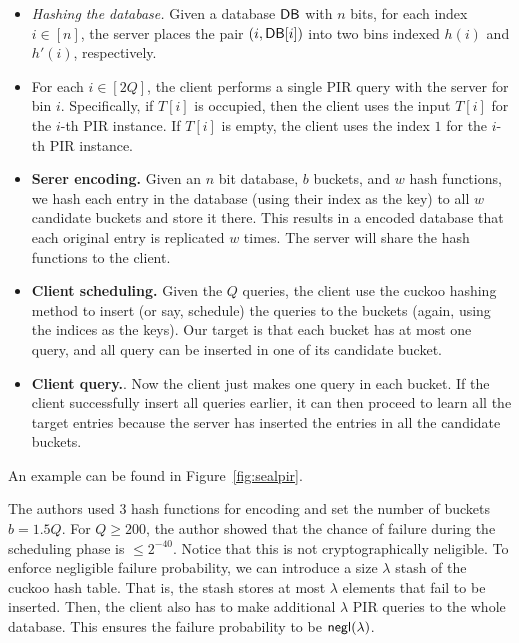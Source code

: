 {\begin{itemize}[leftmargin=7mm]
The client sends the description of $h$ and $h'$ to the server.
In practice, we can use a PRF to realize $h$ and $h'$, so the client
can choose two random PRF keys 
and send them to the server.

\item 
{\it Hashing the database.}
Given a database ${\sf DB}$ with $n$ bits, 
for each index $i \in [n]$, %
the server places the pair $(i, {\sf DB}[i])$
into two bins indexed $h(i)$ and $h'(i)$, respectively.

\item 
For each $i \in [2Q]$, the client performs 
a single PIR query with the server for bin $i$. 
Specifically, if $T[i]$ is occupied, then  
the client uses the input $T[i]$ for the $i$-th PIR instance. 
If $T[i]$ is empty, the client uses the index $1$ for the $i$-th PIR instance. 

\end{itemize}

\begin{itemize}
    \item \textbf{Serer encoding.} Given an $n$ bit database, $b$ buckets, and $w$ hash functions, we hash each entry in the database (using their index as the key) to all $w$ candidate buckets and store it there.
    This results in a encoded database that each original entry is replicated $w$ times.
    The server will share the hash functions to the client.
    
    \item \textbf{Client scheduling.} Given the $Q$ queries, the client use the cuckoo hashing method to insert (or say, schedule) the queries to the buckets (again, using the indices as the keys).
    Our target is that each bucket has at most one query, and all query can be inserted in one of its candidate bucket.
    
    \item \textbf{Client query.}. Now the client just makes one query in each bucket. If the client successfully insert all queries earlier, it can then proceed to learn all the target entries because the server has inserted the entries in all the candidate buckets.
\end{itemize}

An example can be found in Figure~\ref{fig:sealpir}.
   
The authors used 3 hash functions for encoding and set the number of buckets $b = 1.5Q$. For $Q\geq 200$, the author showed that the chance of failure during
the scheduling phase is $\leq 2^{-40}$.
Notice that this is not cryptographically neligible. 
To enforce negligible failure probability, we can introduce a size $\lambda$ stash of the cuckoo hash table.
That is, the stash stores at most $\lambda$ elements that fail to be inserted. 
Then, the client also has to make additional $\lambda$ PIR queries to the whole database.
This ensures the failure probability to be ${\sf negl}(\lambda)$.

}
